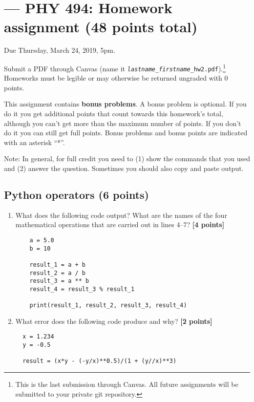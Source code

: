 \documentclass[letterpaper]{scrartcl}
\newcommand{\anumber}{2}
\newcounter{TotalPoints}
\newcommand{\points}[1]{\textbf{[#1 points]}\stepcounter{TotalPoints}}
\newenvironment{enuma}{\begin{enumerate}[label=(\alph*)]}{\end{enumerate}}
\begin{document}

\setcounter{section}{\anumber}
\addtocounter{section}{-1}
\section{ --- PHY 494: Homework assignment (48 points total)}

\noindent Due Thursday, March 24, 2019, 5pm.

\noindent Submit a PDF through Canvas (name it
\texttt{\emph{lastname}\_\emph{firstname}\_hw\anumber.pdf}).\footnote{This
is the last submission through Canvas. All future assignments will be
submitted to your private git repository.}
Homeworks must be legible or may otherwise be returned ungraded with 0
points.


This assignment contains \textbf{bonus problems}. A bonus problem is
optional. If you do it you get additional points that count towards
this homework's total, although you can't get more than the maximum
number of points. If you don't do it you can still get full
points. Bonus problems and bonus points are indicated with an asterisk
``*''.

Note: In general, for full credit you need to (1) show the commands
that you used and (2) answer the question. Sometimes you should also
copy and paste output.

\subsection{Python operators (6 points)}

\begin{enuma}
\item What does the following code output? What are the names of the four
  mathematical operations that are carried out in lines 4--7? \points{4}
  \begin{verbatim}
    a = 5.0
    b = 10
    
    result_1 = a + b
    result_2 = a / b
    result_3 = a ** b
    result_4 = result_3 % result_1
    
    print(result_1, result_2, result_3, result_4)
  \end{verbatim}
\item What error does the following code produce and why? \points{2}
  \begin{verbatim}
  x = 1.234
  y = -0.5

  result = (x*y - (-y/x)**0.5)/(1 + (y//x)**3)
  \end{verbatim}
\end{enuma}
\end{document}
